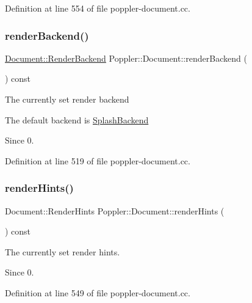 Definition at line 554 of file poppler-\/document.\+cc.

\mbox{\label{class_poppler_1_1_document_ae9aefd54aa4b72dc46bea2c114a02cbe}} 
\subsubsection{\texorpdfstring{render\+Backend()}{renderBackend()}}
{\footnotesize\ttfamily \hyperlink{class_poppler_1_1_document_a4b0a8ab6b6f686c8802a0ad112d48247}{Document\+::\+Render\+Backend} Poppler\+::\+Document\+::render\+Backend (\begin{DoxyParamCaption}{ }\end{DoxyParamCaption}) const}

The currently set render backend

The default backend is \hyperlink{class_poppler_1_1_document_a4b0a8ab6b6f686c8802a0ad112d48247a1a046556585f9df9a7657fbbc64340bb}{Splash\+Backend}

\begin{DoxySince}{Since}
0. 
\end{DoxySince}


Definition at line 519 of file poppler-\/document.\+cc.

\mbox{\label{class_poppler_1_1_document_a0dfc519e40d570461d26ce5b49e87466}} 
\subsubsection{\texorpdfstring{render\+Hints()}{renderHints()}}
{\footnotesize\ttfamily Document\+::\+Render\+Hints Poppler\+::\+Document\+::render\+Hints (\begin{DoxyParamCaption}{ }\end{DoxyParamCaption}) const}

The currently set render hints.

\begin{DoxySince}{Since}
0. 
\end{DoxySince}


Definition at line 549 of file poppler-\/document.\+cc.

